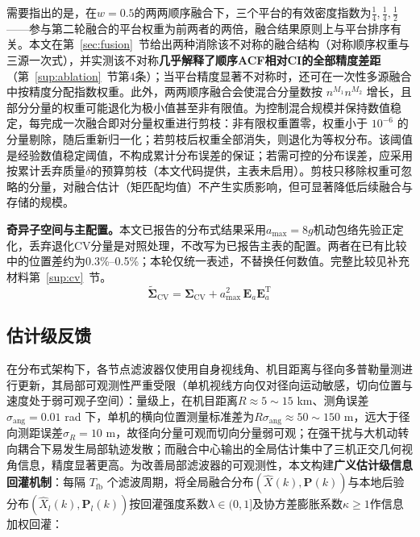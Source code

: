 \documentclass[UTF8,a4paper,zihao=-4]{ctexart}
\begin{document}
需要指出的是，在\(w=0.5\)的两两顺序融合下，三个平台的有效密度指数为\(\tfrac14,\tfrac14,\tfrac12\)——参与第二轮融合的平台权重为前两者的两倍，融合结果原则上与平台排序有关。本文在第~\ref{sec:fusion}~节给出两种消除该不对称的融合结构（对称顺序权重与三源一次式），并实测该不对称\textbf{几乎解释了顺序ACF相对CI的全部精度差距}（第~\ref{sup:ablation}~节第4条）；当平台精度显著不对称时，还可在一次性多源融合中按精度分配指数权重。此外，两两顺序融合会使混合分量数按 \(n^{M_1}n^{M_2}\) 增长，且部分分量的权重可能退化为极小值甚至非有限值。为控制混合规模并保持数值稳定，每完成一次融合即对分量权重进行剪枝：非有限权重置零，权重小于 \(10^{-6}\) 的分量剔除，随后重新归一化；若剪枝后权重全部消失，则退化为等权分布。该阈值是经验数值稳定阈值，不构成累计分布误差的保证；若需可控的分布误差，应采用按累计丢弃质量\(\delta\)的预算剪枝（本文代码提供，主表未启用）。剪枝只移除权重可忽略的分量，对融合估计（矩匹配均值）不产生实质影响，但可显著降低后续融合与存储的规模。

\noindent\textbf{奇异子空间与主配置。}本文已报告的分布式结果采用\(a_{\max}=8g\)机动包络先验正定化，丢弃退化CV分量是对照处理，不改写为已报告主表的配置。两者在已有比较中的位置差约为0.3\%--0.5\%；本轮仅统一表述，不替换任何数值。完整比较见补充材料第~\ref{sup:cv}~节。
\begin{equation}
\tilde{\boldsymbol{\Sigma}}_{\mathrm{CV}}=\boldsymbol{\Sigma}_{\mathrm{CV}}+a_{\max}^{2}\,\boldsymbol{E}_{a}\boldsymbol{E}_{a}^{\mathrm T}
\label{eq:cv-reg}
\end{equation}



\subsection{估计级反馈}\label{sec:feedback}
在分布式架构下，各节点滤波器仅使用自身视线角、机目距离与径向多普勒量测进行更新，其局部可观测性严重受限（单机视线方向仅对径向运动敏感，切向位置与速度处于弱可观子空间）：量级上，在机目距离\(R\approx5\sim15\) km、测角误差\(\sigma_{\mathrm{ang}}=0.01\) rad 下，单机的横向位置测量标准差为\(R\sigma_{\mathrm{ang}}\approx50\sim150\) m，远大于径向测距误差\(\sigma_R=10\) m，故径向分量可观而切向分量弱可观；在强干扰与大机动转向耦合下易发生局部轨迹发散；而融合中心输出的全局估计集中了三机正交几何视角信息，精度显著更高。为改善局部滤波器的可观测性，本文构建\textbf{广义估计级信息回灌机制}：每隔 \(T_{\mathrm{fb}}\) 个滤波周期，将全局融合分布\((\hat{X}(k),\boldsymbol{P}(k))\)与本地后验分布\((\hat{X}_l(k),\boldsymbol{P}_l(k))\)按回灌强度系数\(\lambda\in(0,1]\)及协方差膨胀系数\(\kappa\ge1\)作信息加权回灌：
\end{document}
